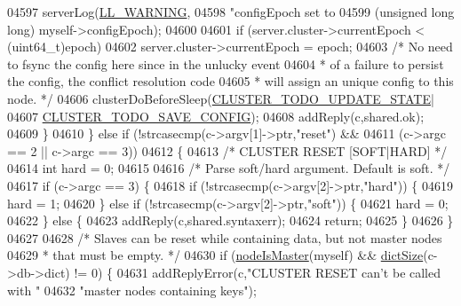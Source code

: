 \begin{DoxyCode}
{{{{{{{{{{{{{{{{{{{{{{{{{{{{{{{{{{{{{{{{{{{{{{{{{{{{{{{{{{{{{{{{{{{{{{{{{{{{{{{{{{{{{{{{{{{{{{{{{{{{{{{{{04597             serverLog(\hyperlink{server_8h_a31229b9334bba7d6be2a72970967a14b}{LL\_WARNING},
04598                 \textcolor{stringliteral}{"configEpoch set to %
04599                 (\textcolor{keywordtype}{unsigned} \textcolor{keywordtype}{long} \textcolor{keywordtype}{long}) myself->configEpoch);
04600 
04601             \textcolor{keywordflow}{if} (server.cluster->currentEpoch < (uint64\_t)epoch)
04602                 server.cluster->currentEpoch = epoch;
04603             \textcolor{comment}{/* No need to fsync the config here since in the unlucky event}
04604 \textcolor{comment}{             * of a failure to persist the config, the conflict resolution code}
04605 \textcolor{comment}{             * will assign an unique config to this node. */}
04606             clusterDoBeforeSleep(\hyperlink{cluster_8h_abea0d393cba342261e4a7e6fb745f388}{CLUSTER\_TODO\_UPDATE\_STATE}|
04607                                  \hyperlink{cluster_8h_a0ae5ff08fbae3c655012b4de8bfc327d}{CLUSTER\_TODO\_SAVE\_CONFIG});
04608             addReply(c,shared.ok);
04609         \}
04610     \} \textcolor{keywordflow}{else} \textcolor{keywordflow}{if} (!strcasecmp(c->argv[1]->ptr,\textcolor{stringliteral}{"reset"}) &&
04611                (c->argc == 2 || c->argc == 3))
04612     \{
04613         \textcolor{comment}{/* CLUSTER RESET [SOFT|HARD] */}
04614         \textcolor{keywordtype}{int} hard = 0;
04615 
04616         \textcolor{comment}{/* Parse soft/hard argument. Default is soft. */}
04617         \textcolor{keywordflow}{if} (c->argc == 3) \{
04618             \textcolor{keywordflow}{if} (!strcasecmp(c->argv[2]->ptr,\textcolor{stringliteral}{"hard"})) \{
04619                 hard = 1;
04620             \} \textcolor{keywordflow}{else} \textcolor{keywordflow}{if} (!strcasecmp(c->argv[2]->ptr,\textcolor{stringliteral}{"soft"})) \{
04621                 hard = 0;
04622             \} \textcolor{keywordflow}{else} \{
04623                 addReply(c,shared.syntaxerr);
04624                 \textcolor{keywordflow}{return};
04625             \}
04626         \}
04627 
04628         \textcolor{comment}{/* Slaves can be reset while containing data, but not master nodes}
04629 \textcolor{comment}{         * that must be empty. */}
04630         \textcolor{keywordflow}{if} (\hyperlink{cluster_8h_a2d8e84269474d8750565fb3fb67aa436}{nodeIsMaster}(myself) && \hyperlink{dict_8h_af193430dd3d5579a52b194512f72c1f0}{dictSize}(c->db->dict) != 0) \{
04631             addReplyError(c,\textcolor{stringliteral}{"CLUSTER RESET can't be called with "}
04632                             \textcolor{stringliteral}{"master nodes containing keys"});
}}}}}}}}}}}}}}}}}}}}}}}}}}}}}}}}}}}}}}}}}}}}}}}}}}}}}}}}}}}}}}}}}}}}}}}}}}}}}}}}}}}}}}}}}}}}}}}}}}}}}}}}}}
\end{DoxyCode}
